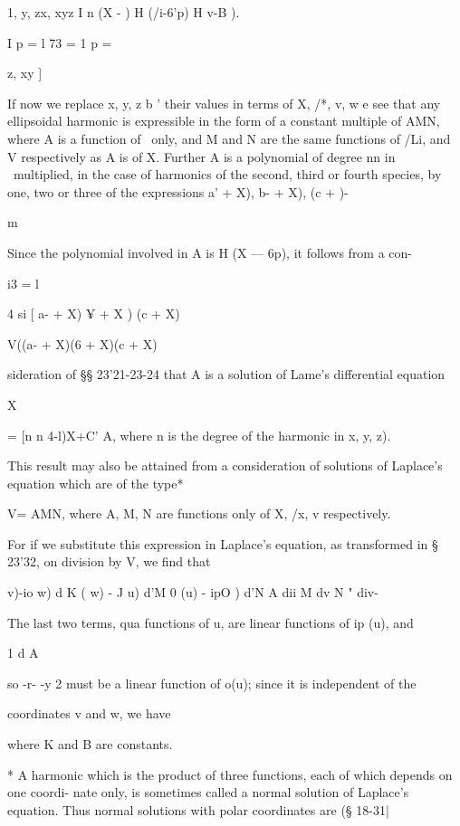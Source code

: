 {{{1, y, zx, xyz I n (X -  ) H (/i-6'p) H  v-B ). 

I p = l 73 = 1 p = \ 

z, xy ] 

If now we replace x, y, z b ' their values in terms of X, /*, v, w e see that 
any ellipsoidal harmonic is expressible in the form of a constant multiple of 
AMN, where A is a function of \ only, and M and N are the same functions 
of /Li, and V respectively as A is of X. Further A is a polynomial of degree nn 
in \ multiplied, in the case of harmonics of the second, third or fourth 
species, by one, two or three of the expressions \/ a' + X), \/ b- + X), \/(c  +  )- 

m 

Since the polynomial involved in A is H (X — 6p), it follows from a con- 



i3 = l 



4 si [ a- + X)  ¥ + X ) (c  + X)    



V((a-  + X)(6  + X)(c  + X)   



sideration of §§ 23'21-23-24 that A is a solution of Lame's differential equation 

X 

= [n n 4-l)X+C'  A, 
where n is the degree of the harmonic in  x, y, z). 

This result may also be attained from a consideration of solutions of 
Laplace's equation which are of the type* 

V= AMN, 
where A, M, N are functions only of X, /x, v respectively. 

For if we substitute this expression in Laplace's equation, as transformed 
in § 23'32, on division by V, we find that 

  v)-io w) d K  ( w) -  J  u) d'M  0 (u) - ipO ) d'N   
A dii  M dv  N " div- 

The last two terms, qua functions of u, are linear functions of ip (u), and 

1 d A 

so -r- -y 2 must be a linear function of  o(u); since it is independent of the 

coordinates v and w, we have 

where K and B are constants. 

* A harmonic which is the product of three functions, each of which depends on one coordi- 
nate only, is sometimes called a normal solution of Laplace's equation. Thus normal solutions 
with polar coordinates are (§ 18-31| 

}}}
